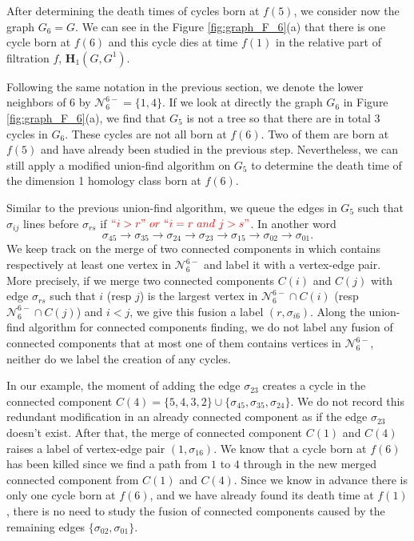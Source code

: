 \documentclass[a4paper,12pt]{article}
\numberwithin{equation}{section}
\begin{document}
	After determining the death times of cycles born at $f(5)$, we consider now the graph $G_6 = G$. We can see in the Figure \ref{fig:graph_F_6}(a) that there is one cycle born at $f(6)$ and this cycle dies at time $f(1)$ in the relative part of filtration $f$, $\mathbf{H}_1(G,G^1)$. 
	
	Following the same notation in the previous section, we denote the lower neighbors of $6$ by $\mathcal{N}_6^{6-} = \{1,4\}$. If we look at directly the graph $G_6$ in Figure \ref{fig:graph_F_6}(a), we find that $G_5$ is not a tree so that there are in total 3 cycles in $G_6$. These cycles are not all born at $f(6)$. Two of them are born at $f(5)$ and have already been studied in the previous step. Nevertheless, we can still apply a modified union-find algorithm on $G_5$ to determine the death time of the dimension 1 homology class born at $f(6)$. 
	
	Similar to the previous union-find algorithm, we queue the edges in $G_5$ such that $\sigma_{ij}$ lines before $\sigma_{rs}$ if $\color{red} ``i>r" \  or \  ``i=r \ and \ j>s"$. In another word
	$$ \sigma_{45} \to \sigma_{35} \to \sigma_{24} \to \sigma_{23} \to \sigma_{15} \to \sigma_{02} \to \sigma_{01}.$$ We keep track on the merge of two connected components in which contains respectively at least one vertex in $\mathcal{N}_6^{6-}$ and label it with a vertex-edge pair. More precisely, if we merge two connected components $C(i)$ and $C(j)$ with edge $\sigma_{rs}$ such that $i$ (resp $j$) is the largest vertex in $\mathcal{N}_{6}^{6-} \cap C(i)$ (resp $\mathcal{N}_{6}^{6-} \cap C(j)$) and $i<j$, we give this fusion a label $(r, \sigma_{i6})$. Along the union-find algorithm for connected components finding, we do not label any fusion of connected components that at most one of them contains vertices in $\mathcal{N}_{6}^{6-}$, neither do we label the creation of any cycles. 
	
	In our example, the moment of adding the edge $\sigma_{23}$ creates a cycle in the connected component $C(4) = \{5,4,3,2\} \cup \{\sigma_{45}, \sigma_{35}, \sigma_{24}\}$. We do not record this redundant modification in an already connected component as if the edge $\sigma_{23}$ doesn't exist. 	After that, the merge of connected component $C(1)$ and $C(4)$ raises a label of vertex-edge pair $(1, \sigma_{16})$. We know that a cycle born at $f(6)$ has been killed since we find a path from $1$ to $4$ through in the new merged connected component from $C(1)$ and $C(4)$. Since we know in advance there is only one cycle born at $f(6)$, and we have already found its death time at $f(1)$, there is no need to study the fusion of connected components caused by the remaining edges $\{ \sigma_{02}, \sigma_{01} \}$.	
	
\end{document}

